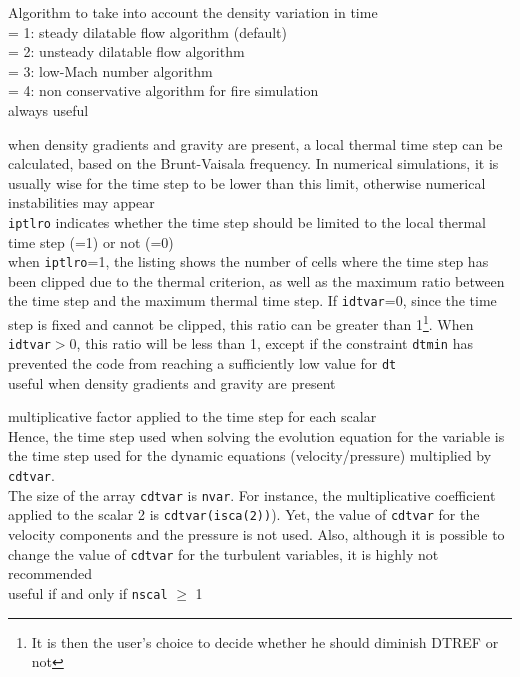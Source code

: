 {Algorithm to take into account the density variation in time\\
\hspace*{1.3cm}= 1: steady dilatable flow algorithm (default)\\
\hspace*{1.3cm}= 2: unsteady dilatable flow algorithm\\
\hspace*{1.3cm}= 3: low-Mach number algorithm\\
\hspace*{1.3cm}= 4: non conservative algorithm for fire simulation\\
always useful}

{when density gradients and gravity are present, a local thermal time
step can be calculated, based on the Brunt-Vaisala frequency. In numerical
simulations, it is usually wise for the time step to be lower than this limit,
otherwise numerical instabilities may appear\\
{\tt iptlro} indicates whether the time step should be limited to the local thermal
time step (=1) or not (=0)\\
when {\tt iptlro}=1, the listing shows the number of cells where the time step has
been clipped due to the thermal criterion, as well as the maximum ratio between
the time step and the maximum thermal time step. If {\tt idtvar}=0, since the time
step is fixed and cannot be clipped, this ratio can be greater than
1\footnote{It is then the user's
choice to decide whether he should diminish DTREF or not}. When {\tt idtvar}$>$0, this
ratio will be less than 1, except if the constraint {\tt dtmin} has prevented the
code from reaching a sufficiently low value for {\tt dt}\\
useful when density gradients and gravity are present}

{multiplicative factor applied to the time step for each scalar\\
Hence, the time step used when solving the evolution equation for the
variable is the time step used for the dynamic equations (velocity/pressure)
multiplied by {\tt cdtvar}.\\
The size of the array {\tt cdtvar} is {\tt nvar}. For instance, the multiplicative
coefficient applied to the scalar 2 is {\tt cdtvar(isca(2))}). Yet, the value of
{\tt cdtvar} for the velocity components and the pressure is not used. Also,
although it is possible to change the value of {\tt cdtvar} for the turbulent
variables, it is highly not recommended\\
useful if and only if {\tt nscal} $\geqslant$ 1}


